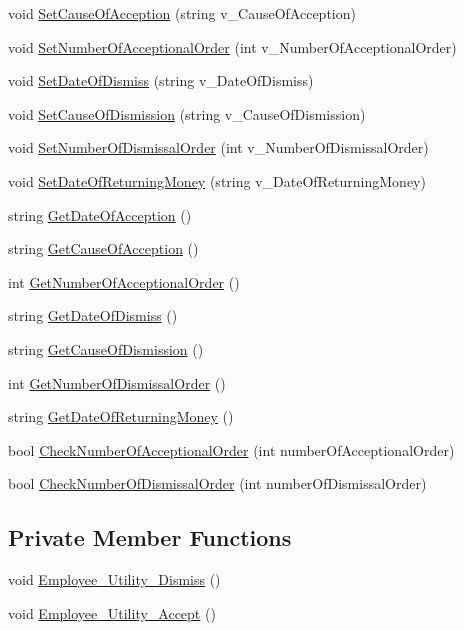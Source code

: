 \begin{DoxyCompactItemize}
void \hyperlink{class_employee_a7eebc60f8cfd43fe07fae6196a317b0c}{Set\+Cause\+Of\+Acception} (string v\+\_\+\+Cause\+Of\+Acception)
\item 
void \hyperlink{class_employee_ae0a2d5a5ec36af567bc7e434d18de422}{Set\+Number\+Of\+Acceptional\+Order} (int v\+\_\+\+Number\+Of\+Acceptional\+Order)
\item 
void \hyperlink{class_employee_acbb98daeb702b22d616c8b7064784210}{Set\+Date\+Of\+Dismiss} (string v\+\_\+\+Date\+Of\+Dismiss)
\item 
void \hyperlink{class_employee_ac129a41d2cb756360ad056bf39c25464}{Set\+Cause\+Of\+Dismission} (string v\+\_\+\+Cause\+Of\+Dismission)
\item 
void \hyperlink{class_employee_abcf46d071f43b17f0a83b00a327822b9}{Set\+Number\+Of\+Dismissal\+Order} (int v\+\_\+\+Number\+Of\+Dismissal\+Order)
\item 
void \hyperlink{class_employee_a3ffb3c8c2dc4817f88801be832eb8caa}{Set\+Date\+Of\+Returning\+Money} (string v\+\_\+\+Date\+Of\+Returning\+Money)
\item 
string \hyperlink{class_employee_ad8df9b482bc23365e06357005524c5fd}{Get\+Date\+Of\+Acception} ()
\item 
string \hyperlink{class_employee_a462e85cd69817614a7c9e030fb806f29}{Get\+Cause\+Of\+Acception} ()
\item 
int \hyperlink{class_employee_a8ad22e912e2e4e336416df20480ceb54}{Get\+Number\+Of\+Acceptional\+Order} ()
\item 
string \hyperlink{class_employee_a9bf98793dad6f452b3b99b353a4a6635}{Get\+Date\+Of\+Dismiss} ()
\item 
string \hyperlink{class_employee_aa7e35077b13efe6cbc362dc7b561b010}{Get\+Cause\+Of\+Dismission} ()
\item 
int \hyperlink{class_employee_a521952ca263ba6ad783c634631070076}{Get\+Number\+Of\+Dismissal\+Order} ()
\item 
string \hyperlink{class_employee_a7782178746f3640942450a0f7271ef60}{Get\+Date\+Of\+Returning\+Money} ()
\item 
bool \hyperlink{class_employee_a48638241e63b03873954369b285d1cd9}{Check\+Number\+Of\+Acceptional\+Order} (int number\+Of\+Acceptional\+Order)
\item 
bool \hyperlink{class_employee_ac7bf1d7191d60ada37e85f8d311a254d}{Check\+Number\+Of\+Dismissal\+Order} (int number\+Of\+Dismissal\+Order)
\end{DoxyCompactItemize}
\subsection*{Private Member Functions}
\begin{DoxyCompactItemize}
\item 
void \hyperlink{class_employee_a6d9c2cbf05d3137a24c322b1525fffa2}{Employee\+\_\+\+Utility\+\_\+\+Dismiss} ()
\item 
void \hyperlink{class_employee_a534f83eb6f2f106f72d802fcae00eb14}{Employee\+\_\+\+Utility\+\_\+\+Accept} ()
\end{DoxyCompactItemize}
